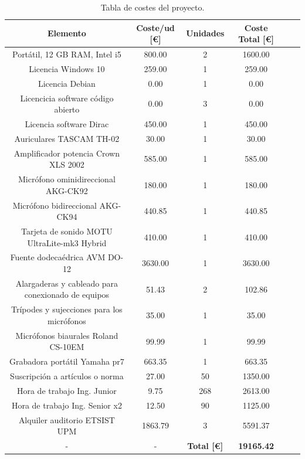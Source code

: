 \documentclass[11pt,a4paper]{book}
\begin{document}
        \begin{table}[H]
			\begin{center}
			\begin{scriptsize}
			\begin{tabular}{| c || c | c | c | c | c |}
				\hline
				\textbf{Elemento}&\textbf{Coste/ud [\euro]}&\textbf{Unidades}&\textbf{Coste Total [\euro]}\\ \hline
                Portátil, 12 GB RAM, Intel i5&800.00&2&1600.00\\ \hline
                Licencia Windows 10&259.00&1&259.00\\ \hline
                Licencia Debian&0.00&1&0.00\\ \hline
                Licencicia software código abierto&0.00&3&0.00\\ \hline
                Licencia software Dirac&450.00&1&450.00\\ \hline
                Auriculares TASCAM TH-02&30.00&1&30.00\\ \hline
                Amplificador potencia Crown XLS 2002&585.00&1&585.00\\ \hline
                Micrófono ominidireccional AKG-CK92&180.00&1&180.00\\ \hline
                Micrófono bidireccional AKG-CK94&440.85&1&440.85\\ \hline
                Tarjeta de sonido MOTU UltraLite-mk3 Hybrid&410.00&1&410.00\\ \hline
                Fuente dodecaédrica AVM DO-12&3630.00&1&3630.00\\ \hline
                Alargaderas y cableado para conexionado de equipos&51.43&2&102.86\\ \hline
                Trípodes y sujecciones para los micrófonos&35.00&1&35.00\\ \hline
                Micrófonos biaurales Roland CS-10EM&99.99&1&99.99\\ \hline
                Grabadora portátil Yamaha pr7&663.35&1&663.35\\ \hline
                Suscripción a artículos o norma&27.00&50&1350.00\\ \hline
                Hora de trabajo Ing. Junior&9.75&268&2613.00\\ \hline
                Hora de trabajo Ing. Senior x2&12.50&90&1125.00\\ \hline
                Alquiler auditorio ETSIST UPM&1863.79&3&5591.37\\ \hline
                -&-&\textbf{Total [\euro]}&\textbf{19165.42}\\ \hline
        
            \end{tabular}
			\caption{Tabla de costes del proyecto.}
			\label{table:tablaPresupuesto}
			\end{scriptsize}
			\end{center}	
		\end{table}
\end{document}
